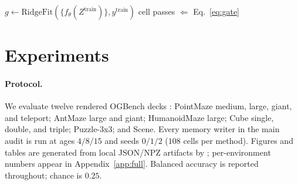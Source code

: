 \begin{algorithm}[t]
\SetAlgoLined
\DontPrintSemicolon
{}
\caption{Label-free masked patch-set training with the bounded streaming writer
  (per method; only $f_\theta$ changes).  With a chunk larger than the sequence
  the loop reduces to the one-shot writer $M\leftarrow f_\theta(Z)$ of
  Eq.~\eqref{eq:slot}, which we keep as an ablation.}
\label{alg:train}
\end{algorithm}

\begin{algorithm}[t]
\SetAlgoLined
\DontPrintSemicolon
{}
$g \leftarrow \mathrm{RidgeFit}(\{f_\theta(Z^{\text{train}})\}, y^{\text{train}})$\;
cell passes $\Leftarrow$ Eq.~\eqref{eq:gate}\;
\caption{Fail-closed audit (labels used only here).}
\label{alg:audit}
\end{algorithm}

\section{Experiments}
\label{sec:experiments-main}

\paragraph{Protocol.}
We evaluate twelve rendered OGBench decks \citep{r_ogbench}: PointMaze medium,
large, giant, and teleport; AntMaze large and giant; HumanoidMaze large; Cube
single, double, and triple; Puzzle-3x3; and Scene.  Every memory writer in the
main audit is run at ages $4/8/15$ and seeds $0/1/2$ ($108$ cells per method).
Figures and tables are generated from local JSON/NPZ artifacts by
; per-environment numbers appear in
Appendix~\ref{app:full}.  Balanced accuracy is reported throughout; chance is
$0.25$.

